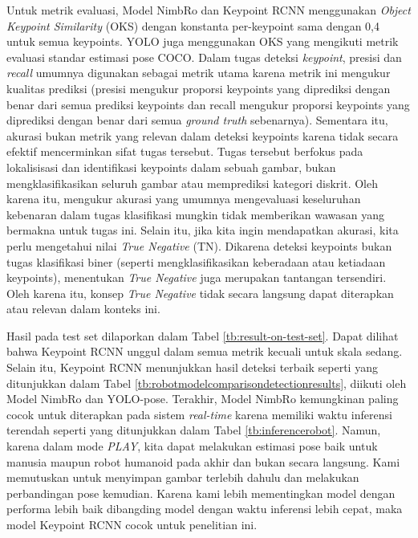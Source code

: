 Untuk metrik evaluasi, Model NimbRo dan Keypoint RCNN menggunakan \textit{Object Keypoint Similarity} (OKS) dengan konstanta per-keypoint sama dengan 0,4 untuk semua keypoints.
YOLO juga menggunakan OKS yang mengikuti metrik evaluasi standar estimasi pose COCO.
Dalam tugas deteksi \textit{keypoint}, presisi dan \textit{recall} umumnya digunakan sebagai metrik utama karena metrik ini mengukur kualitas prediksi (presisi mengukur proporsi keypoints yang diprediksi dengan benar dari semua prediksi keypoints dan recall mengukur proporsi keypoints yang diprediksi dengan benar dari semua \textit{ground truth} sebenarnya).
Sementara itu, akurasi bukan metrik yang relevan dalam deteksi keypoints karena tidak secara efektif mencerminkan sifat tugas tersebut.
Tugas tersebut berfokus pada lokalisisasi dan identifikasi keypoints dalam sebuah gambar, bukan mengklasifikasikan seluruh gambar atau memprediksi kategori diskrit. Oleh karena itu, mengukur akurasi yang umumnya mengevaluasi keseluruhan kebenaran dalam tugas klasifikasi mungkin tidak memberikan wawasan yang bermakna untuk tugas ini.
Selain itu, jika kita ingin mendapatkan akurasi, kita perlu mengetahui nilai \textit{True Negative} (TN). Dikarena deteksi keypoints bukan tugas klasifikasi biner (seperti mengklasifikasikan keberadaan atau ketiadaan keypoints), menentukan \textit{True Negative} juga merupakan tantangan tersendiri. Oleh karena itu, konsep \textit{True Negative} tidak secara langsung dapat diterapkan atau relevan dalam konteks ini.

Hasil pada test set dilaporkan dalam Tabel \ref{tb:result-on-test-set}. Dapat dilihat bahwa Keypoint RCNN unggul dalam semua metrik kecuali untuk skala sedang.
Selain itu, Keypoint RCNN menunjukkan hasil deteksi terbaik seperti yang ditunjukkan dalam Tabel \ref{tb:robotmodelcomparisondetectionresults}, diikuti oleh Model NimbRo dan YOLO-pose.
Terakhir, Model NimbRo kemungkinan paling cocok untuk diterapkan pada sistem \textit{real-time} karena memiliki waktu inferensi terendah seperti yang ditunjukkan dalam Tabel \ref{tb:inferencerobot}.
Namun, karena dalam mode \textit{PLAY}, kita dapat melakukan estimasi pose baik untuk manusia maupun robot humanoid pada akhir dan bukan secara langsung.
Kami memutuskan untuk menyimpan gambar terlebih dahulu dan melakukan perbandingan pose kemudian. Karena kami lebih mementingkan model dengan performa lebih baik dibangding model dengan waktu inferensi lebih cepat, maka model Keypoint RCNN cocok untuk penelitian ini.

